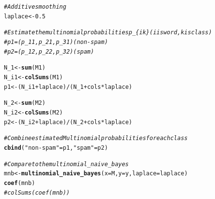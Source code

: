 \documentclass{article}\usepackage[]{graphicx}\usepackage[]{xcolor}
\makeatletter
\newcommand{\hlnum}[1]{\textcolor[rgb]{0.686,0.059,0.569}{#1}}%
\newcommand{\hlstr}[1]{\textcolor[rgb]{0.192,0.494,0.8}{#1}}%
\newcommand{\hlcom}[1]{\textcolor[rgb]{0.678,0.584,0.686}{\textit{#1}}}%
\newcommand{\hlopt}[1]{\textcolor[rgb]{0,0,0}{#1}}%
\newcommand{\hlstd}[1]{\textcolor[rgb]{0.345,0.345,0.345}{#1}}%
\newcommand{\hlkwb}[1]{\textcolor[rgb]{0.69,0.353,0.396}{#1}}%
\newcommand{\hlkwc}[1]{\textcolor[rgb]{0.333,0.667,0.333}{#1}}%
\newcommand{\hlkwd}[1]{\textcolor[rgb]{0.737,0.353,0.396}{\textbf{#1}}}%
\newenvironment{kframe}{%
 \def\at@end@of@kframe{}%
 \ifinner\ifhmode%
  \def\at@end@of@kframe{\end{minipage}}%
  \begin{minipage}{\columnwidth}%
 \fi\fi%
 \def\FrameCommand##1{\hskip\@totalleftmargin \hskip-\fboxsep
 \colorbox{shadecolor}{##1}\hskip-\fboxsep
     \hskip-\linewidth \hskip-\@totalleftmargin \hskip\columnwidth}%
 \MakeFramed {\advance\hsize-\width
   \@totalleftmargin\z@ \linewidth\hsize
   \@setminipage}}%
 {\par\unskip\endMakeFramed%
 \at@end@of@kframe}
\newenvironment{knitrout}{}{} %
\makeatother
\begin{document}
\begin{knitrout}
\begin{kframe}
\begin{alltt}
\hlcom{# Additive smoothing}
\hlstd{laplace} \hlkwb{<-} \hlnum{0.5}

\hlcom{# Estimate the multinomial probabilities p_\{ik\} (i is word, k is class)}
\hlcom{# p1 = (p_11, p_21, p_31) (non-spam)}
\hlcom{# p2 = (p_12, p_22, p_32) (spam)}

\hlstd{N_1} \hlkwb{<-} \hlkwd{sum}\hlstd{(M1)}
\hlstd{N_i1} \hlkwb{<-} \hlkwd{colSums}\hlstd{(M1)}
\hlstd{p1} \hlkwb{<-} \hlstd{(N_i1} \hlopt{+} \hlstd{laplace)} \hlopt{/} \hlstd{(N_1} \hlopt{+} \hlstd{cols} \hlopt{*} \hlstd{laplace)}

\hlstd{N_2} \hlkwb{<-} \hlkwd{sum}\hlstd{(M2)}
\hlstd{N_i2} \hlkwb{<-} \hlkwd{colSums}\hlstd{(M2)}
\hlstd{p2} \hlkwb{<-} \hlstd{(N_i2} \hlopt{+} \hlstd{laplace)} \hlopt{/} \hlstd{(N_2} \hlopt{+} \hlstd{cols} \hlopt{*} \hlstd{laplace)}

\hlcom{# Combine estimated Multinomial probabilities for each class}
\hlkwd{cbind}\hlstd{(}\hlstr{"non-spam"} \hlstd{= p1,} \hlstr{"spam"} \hlstd{= p2)}

\hlcom{# Compare to the multinomial_naive_bayes}
\hlstd{mnb} \hlkwb{<-} \hlkwd{multinomial_naive_bayes}\hlstd{(}\hlkwc{x} \hlstd{= M,} \hlkwc{y} \hlstd{= y,} \hlkwc{laplace} \hlstd{= laplace)}
\hlkwd{coef}\hlstd{(mnb)}
\hlcom{# colSums(coef(mnb))}
\end{alltt}
\end{kframe}
\end{knitrout}
\end{document}
